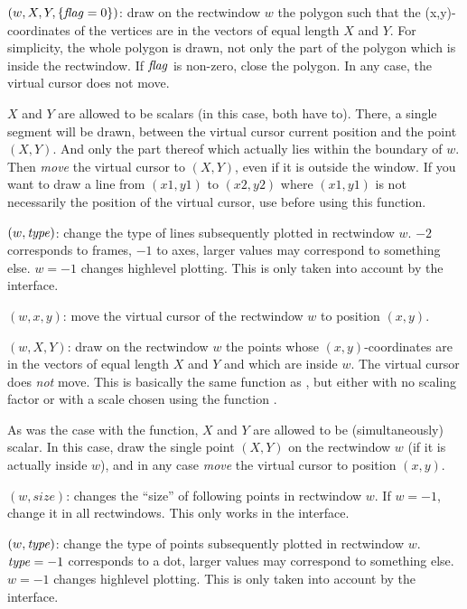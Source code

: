 $(w,X,Y,\{\hbox{\it f\kern0pt lag\/}=0\})$: draw on the rectwindow $w$
the polygon such that the (x,y)-coordinates of the vertices are in the
vectors of equal length $X$ and $Y$. For simplicity, the whole
polygon is drawn, not only the part of the polygon which is inside the
rectwindow. If $\hbox{\it f\kern0pt lag\/}$ is non-zero, close the polygon. In any case, the
virtual cursor does not move.

$X$ and $Y$ are allowed to be scalars (in this case, both have to).
There, a single segment will be drawn, between the virtual cursor current
position and the point $(X,Y)$. And only the part thereof which
actually lies within the boundary of $w$. Then \emph{move} the virtual cursor
to $(X,Y)$, even if it is outside the window. If you want to draw a
line from $(x1,y1)$ to $(x2,y2)$ where $(x1,y1)$ is not necessarily the
position of the virtual cursor, use  before using this
function.

$(w,\hbox{\it type\/})$: change the type of lines
subsequently plotted in rectwindow $w$.  $-2$ corresponds to
frames, $-1$ to axes, larger values may correspond to something else. $w =
-1$ changes highlevel plotting. This is only taken into account by the
 interface.

$(w,x,y)$: move the virtual cursor of the rectwindow $w$
to position $(x,y)$.

$(w,X,Y)$: draw on the rectwindow $w$ the
points whose $(x,y)$-coordinates are in the vectors of equal length $X$ and
$Y$ and which are inside $w$. The virtual cursor does \emph{not} move. This
is basically the same function as , but either with no scaling
factor or with a scale chosen using the function .

As was the case with the  function, $X$ and $Y$ are allowed to
be (simultaneously) scalar. In this case, draw the single point $(X,Y)$ on
the rectwindow $w$ (if it is actually inside $w$), and in any case
\emph{move} the virtual cursor to position $(x,y)$.

$(w,size)$: changes the ``size'' of following
points in rectwindow $w$. If $w = -1$, change it in all rectwindows.
This only works in the  interface.

$(w,\hbox{\it type\/})$:  change the type of
points subsequently plotted in rectwindow $w$. $\hbox{\it type\/} = -1$
corresponds to a dot, larger values may correspond to something else. $w = -1$
changes highlevel plotting. This is only taken into account by the
 interface.

